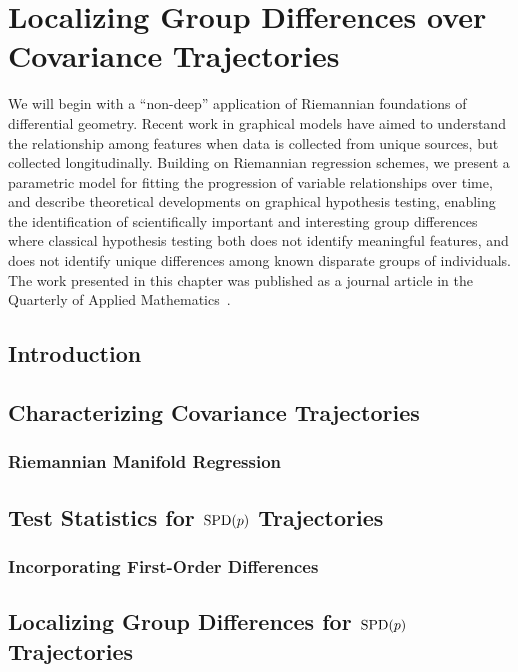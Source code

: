 \chapter{Localizing Group Differences over
Covariance Trajectories}\label{sec:covtraj}

We will begin with a ``non-deep'' application of Riemannian foundations of differential geometry.
Recent work in graphical models have aimed
to understand the relationship among
features when data is collected from
unique sources, but collected longitudinally.
Building on Riemannian regression schemes,
we present a parametric model for fitting
the progression of variable relationships over time,
and describe theoretical developments
on graphical hypothesis testing,
enabling the identification of 
scientifically important and interesting 
group differences
where classical hypothesis testing
both does not identify meaningful features,
and does not identify unique differences
among known disparate groups of individuals.
The work presented in this chapter was published as a journal article in the Quarterly of Applied Mathematics~\citep{covtraj}.


\section{Introduction}

\section{Characterizing Covariance Trajectories}
\label{sec:mglm}

\subsection{Riemannian Manifold Regression}

\section{Test Statistics for $\operatorname*{SPD}(p)$ Trajectories}
\label{sec:hyp-test}

\subsection{Incorporating First-Order Differences}

\section{Localizing Group Differences for $\operatorname*{SPD}(p)$ Trajectories}
\label{sec:loc}


